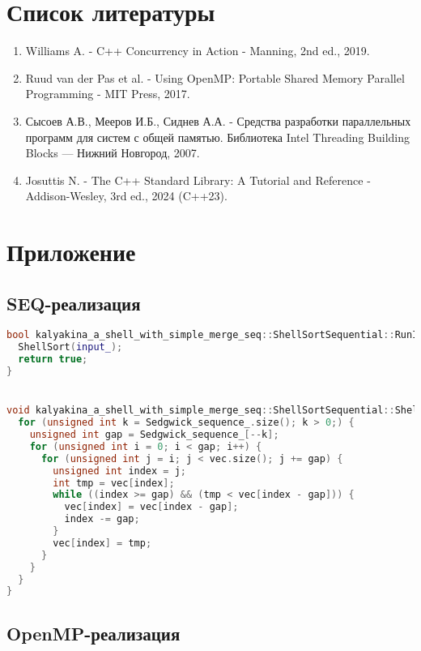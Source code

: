 \documentclass[a4paper,14pt]{extarticle}
\begin{document}
\newpage

\section*{Список литературы}
\begin{enumerate}
    \item Williams A. - C++ Concurrency in Action - Manning, 2nd ed., 2019.
    \item Ruud van der Pas et al. - Using OpenMP: Portable Shared Memory Parallel Programming - MIT Press, 2017.
    \item Сысоев А.В., Мееров И.Б., Сиднев А.А. - Средства разработки параллельных программ для систем с общей памятью. Библиотека Intel Threading Building Blocks — Нижний Новгород, 2007.
    \item Josuttis N. - The C++ Standard Library: A Tutorial and Reference - Addison-Wesley, 3rd ed., 2024 (C++23).
\end{enumerate}

\newpage

\lstset{style=mystyle}

\section*{Приложение}

\subsection*{SEQ-реализация}

\begin{lstlisting}[language=C++]
bool kalyakina_a_shell_with_simple_merge_seq::ShellSortSequential::RunImpl() {
  ShellSort(input_);
  return true;
}


void kalyakina_a_shell_with_simple_merge_seq::ShellSortSequential::ShellSort(std::vector<int> &vec) {
  for (unsigned int k = Sedgwick_sequence_.size(); k > 0;) {
    unsigned int gap = Sedgwick_sequence_[--k];
    for (unsigned int i = 0; i < gap; i++) {
      for (unsigned int j = i; j < vec.size(); j += gap) {
        unsigned int index = j;
        int tmp = vec[index];
        while ((index >= gap) && (tmp < vec[index - gap])) {
          vec[index] = vec[index - gap];
          index -= gap;
        }
        vec[index] = tmp;
      }
    }
  }
}
\end{lstlisting}

\subsection*{OpenMP-реализация}
\end{document}
